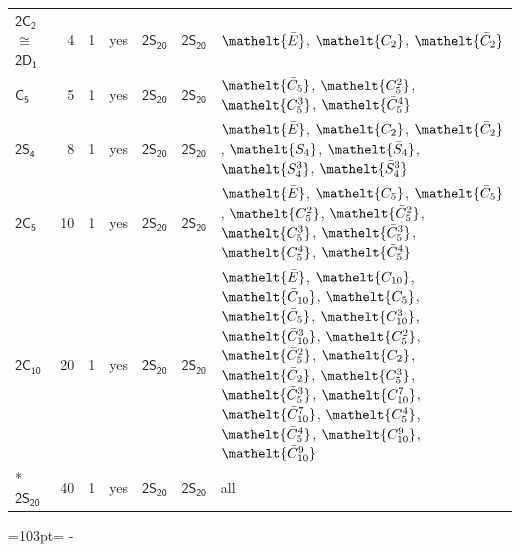 \documentclass[10pt,a4paper]{article}
\newcommand{\needspace}[1]{\par\penalty-100\begingroup\dimen0=#1\relax\dimen2=\pagegoal
  \advance\dimen2-\pagetotal\ifdim\dimen0>\dimen2\relax\ifdim\dimen2>0pt\vfil\break\fi\fi
  \endgroup}
\numberwithin{equation}{section}
\newcommand{\eltfont}[1]{{\let\sigma\eltsigma\mathelt{#1}}}
\newcommand{\grp}[1]{\mathsf{#1}}
\newcommand{\cls}[1]{\eltfont{#1}}
\newcommand{\samecls}{\cong}
\newcommand{\barred}[1]{\bar{#1}}
\newlength{\fillwidth}\newlength{\cellwidth}\newlength{\colwidth}
\begin{document}
{\begin{longtable}{@{}lrrlll>{\RaggedRight\arraybackslash}p{\fillwidth}@{}}
\href{2C2.pdf}{$\grp{2C_{2}}$} $\samecls$ \href{2D1.pdf}{$\grp{2D_{1}}$} & 4 & 1 & yes & \href{2S20.pdf}{$\grp{2S_{20}}$} & \href{2S20.pdf}{$\grp{2S_{20}}$} & $\cls{\barred{E}}$, $\cls{C_{2}}$, $\cls{\barred{C}_{2}}$\\
\href{C5.pdf}{$\grp{C_{5}}$} & 5 & 1 & yes & \href{2S20.pdf}{$\grp{2S_{20}}$} & \href{2S20.pdf}{$\grp{2S_{20}}$} & $\cls{\barred{C}_{5}}$, $\cls{C_{5}^{2}}$, $\cls{C_{5}^{3}}$, $\cls{\barred{C}_{5}^{4}}$\\
\href{2S4.pdf}{$\grp{2S_{4}}$} & 8 & 1 & yes & \href{2S20.pdf}{$\grp{2S_{20}}$} & \href{2S20.pdf}{$\grp{2S_{20}}$} & $\cls{\barred{E}}$, $\cls{C_{2}}$, $\cls{\barred{C}_{2}}$, $\cls{S_{4}}$, $\cls{\barred{S}_{4}}$, $\cls{S_{4}^{3}}$, $\cls{\barred{S}_{4}^{3}}$\\
\href{2C5.pdf}{$\grp{2C_{5}}$} & 10 & 1 & yes & \href{2S20.pdf}{$\grp{2S_{20}}$} & \href{2S20.pdf}{$\grp{2S_{20}}$} & $\cls{\barred{E}}$, $\cls{C_{5}}$, $\cls{\barred{C}_{5}}$, $\cls{C_{5}^{2}}$, $\cls{\barred{C}_{5}^{2}}$, $\cls{C_{5}^{3}}$, $\cls{\barred{C}_{5}^{3}}$, $\cls{C_{5}^{4}}$, $\cls{\barred{C}_{5}^{4}}$\\
\href{2C10.pdf}{$\grp{2C_{10}}$} & 20 & 1 & yes & \href{2S20.pdf}{$\grp{2S_{20}}$} & \href{2S20.pdf}{$\grp{2S_{20}}$} & $\cls{\barred{E}}$, $\cls{C_{10}}$, $\cls{\barred{C}_{10}}$, $\cls{C_{5}}$, $\cls{\barred{C}_{5}}$, $\cls{C_{10}^{3}}$, $\cls{\barred{C}_{10}^{3}}$, $\cls{C_{5}^{2}}$, $\cls{\barred{C}_{5}^{2}}$, $\cls{C_{2}}$, $\cls{\barred{C}_{2}}$, $\cls{C_{5}^{3}}$, $\cls{\barred{C}_{5}^{3}}$, $\cls{C_{10}^{7}}$, $\cls{\barred{C}_{10}^{7}}$, $\cls{C_{5}^{4}}$, $\cls{\barred{C}_{5}^{4}}$, $\cls{C_{10}^{9}}$, $\cls{\barred{C}_{10}^{9}}$\\*
\href{2S20.pdf}{$\grp{2S_{20}}$} & 40 & 1 & yes & \href{2S20.pdf}{$\grp{2S_{20}}$} & \href{2S20.pdf}{$\grp{2S_{20}}$} & all\\
\bottomrule\end{longtable}}
\needspace{103pt}
\end{document}

